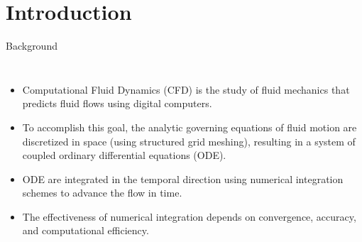
\usepackage{subfig}




\frame{\titlepage}

\section{Introduction}
\begin{frame}{Background}
  \begin{columns}
      \begin{itemize}
        \item Computational Fluid Dynamics (CFD) is the study of fluid mechanics that predicts fluid
          flows using digital computers.
        \item To accomplish this goal, the analytic governing equations of fluid motion are
          discretized in space (using structured grid meshing), resulting in a system of coupled
          ordinary differential equations (ODE).
        \item ODE are integrated in the temporal direction using numerical integration schemes to
          advance the flow in time.
        \item The effectiveness of numerical integration depends on convergence, accuracy, and
          computational efficiency.
      \end{itemize}   
  \end{columns}
\end{frame}

